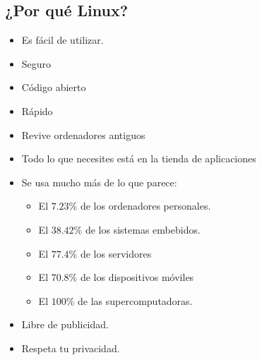 \documentclass[aspectratio=43]{beamer}
\begin{document}
    \subsection{¿Por qué Linux?}
    \begin{frame}{\secname}{\subsecname}
        \begin{itemize}
            \item Es fácil de utilizar.
            \item Seguro
            \item Código abierto
            \item Rápido
            \item Revive ordenadores antiguos
            \item Todo lo que necesites está en la tienda de aplicaciones
            \item Se usa mucho más de lo que parece:
            \begin{itemize}
                \item El $7.23\%$ de los ordenadores personales.
                \item El $38.42\%$ de los sistemas embebidos.
                \item El $77.4\%$ de los servidores
                \item El $70.8\%$ de los dispositivos móviles
                \item El $100\%$ de las supercomputadoras.
            \end{itemize}
            \item Libre de publicidad.
            \item Respeta tu privacidad.
        \end{itemize}
    \end{frame}

\end{document}
